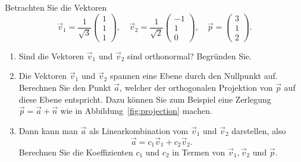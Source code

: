 \begin{aufgabe}
	Betrachten Sie die Vektoren
	\begin{equation*}
		\vec v_1=\frac{1}{\sqrt{3}}\begin{pmatrix}
			1 \\ 1 \\ 1
		\end{pmatrix},\quad
		\vec v_2=\frac{1}{\sqrt{2}}\begin{pmatrix}
			-1 \\ 1 \\  0
		\end{pmatrix},\quad
		\vec p=\begin{pmatrix}
			3 \\ 1 \\  2
		\end{pmatrix}.
	\end{equation*}
	\begin{enumerate}[label=(\alph*)]
		\item Sind die Vektoren $\vec v_1$ und $\vec v_2$ sind orthonormal? Begründen Sie.
		\item Die Vektoren $\vec v_1$ und $\vec v_2$ spannen eine Ebene durch den Nullpunkt auf.
		Berechnen Sie den Punkt $\vec a$, welcher der orthogonalen Projektion von $\vec p$ auf diese Ebene entspricht.
		Dazu können Sie zum Beispiel eine Zerlegung $\vec p=\vec a+\vec n$ wie in Abbildung~\ref{fig:projection} machen.
		\item Dann kann man $\vec a$ als Linearkombination vom $\vec v_1$ und $\vec v_2$ darstellen, also
		\begin{equation*}
			\vec a=c_1\vec v_1+c_2\vec v_2.
		\end{equation*}
		Berechnen Sie die Koeffizienten $c_1$ und $c_2$ in Termen von $\vec v_1,\vec v_2$ und $\vec p$.
	\end{enumerate}
\end{aufgabe}
